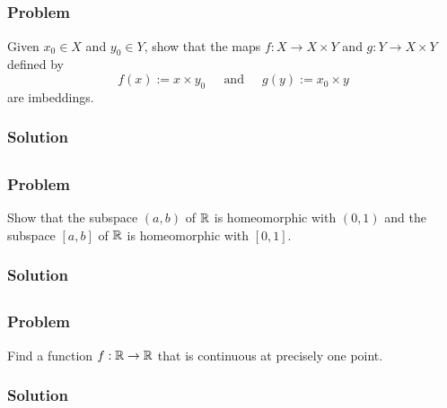 \subsection{}

\subsubsection{Problem}
Given $x_0 \in X$ and $y_0 \in Y$, show that the maps $f : X \to X \times Y$ and $g : Y \to X \times Y$ defined by
\[ f(x) := x \times y_0 ~~~~~\mbox{ and }~~~~~ g(y) := x_0 \times y \]
are imbeddings.

\subsubsection{Solution}
\todo


\subsection{}

\subsubsection{Problem}
Show that the subspace $(a, b)$ of $\mathbb R$ is homeomorphic with $(0, 1)$ and the subspace $[a, b]$ of $\mathbb R$ is homeomorphic with $[0, 1]$.

\subsubsection{Solution}
\todo


\setcounter{subsection}{5} %
\subsection{}

\subsubsection{Problem}
Find a function $f : \mathbb R \to \mathbb R$ that is continuous at precisely one point.

\subsubsection{Solution}
\todo

